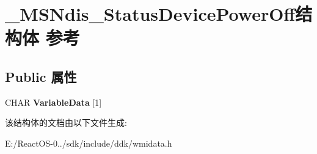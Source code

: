 \hypertarget{struct___m_s_ndis___status_device_power_off}{}\section{\+\_\+\+M\+S\+Ndis\+\_\+\+Status\+Device\+Power\+Off结构体 参考}
\label{struct___m_s_ndis___status_device_power_off}
\subsection*{Public 属性}
\begin{DoxyCompactItemize}
\item 
\mbox{\label{struct___m_s_ndis___status_device_power_off_a8b084b8375d16741e9c055886ca4e45d}} 
C\+H\+AR {\bfseries Variable\+Data} \mbox{[}1\mbox{]}
\end{DoxyCompactItemize}


该结构体的文档由以下文件生成\+:\begin{DoxyCompactItemize}
\item 
E\+:/\+React\+O\+S-\/0../sdk/include/ddk/wmidata.\+h\end{DoxyCompactItemize}
